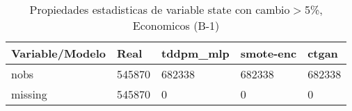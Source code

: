 \begin{table}[H]
\centering
\fontsize{8}{14}\selectfont
\caption{Propiedades estadisticas de variable state con cambio\ensuremath{>}5\%, Economicos (B-1)}
\label{table-stats-economicos-b-1-state-short}
\begin{tabular}{|l|m{10em}|m{10em}|m{10em}|m{10em}|}
\hline
 \rowcolor[gray]{0.8}
Variable/Modelo & Real & tddpm\_mlp & smote-enc & ctgan \\
\hline nobs & 545870 & 682338 & 682338 & 682338 \\
\hline missing & 545870 & 0 & 0 & 0 \\
\hline
\end{tabular}
\end{table}
